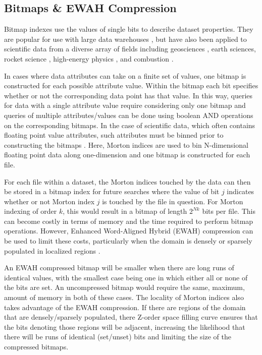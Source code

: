 \documentclass[apjl]{emulateapj}
\begin{document}
\subsection{Bitmaps \& EWAH Compression}
Bitmap indexes use the values of single bits to describe dataset properties. They are popular for use with large data warehouses \citep{Wu1998,Chan1998,Chan1999}, but have also been applied to scientific data from a diverse array of fields including geosciences \citep{Malensek2014}, earth sciences, rocket science \citep{Sinha2006,Sinha2007}, high-energy physics \citep{Stockinger2000}, and combustion \citep{Wu2003}. 

In cases where data attributes can take on a finite set of values, one bitmap is constructed for each possible attribute value. Within the bitmap each bit specifies whether or not the corresponding data point has that value. In this way, queries for data with a single attribute value require considering only one bitmap and queries of multiple attributes/values can be done using boolean AND operations on the corresponding bitmaps. In the case of scientific data, which often contains floating point value attributes, such attributes must be binned prior to constructing the bitmaps \citep{Yu1998,Shoshani1999}. Here, Morton indices are used to bin N-dimensional floating point data along one-dimension and one bitmap is constructed for each file.

For each file within a dataset, the Morton indices touched by the data can then be stored in a bitmap index for future searches where the value of bit $j$ indicates whether or not Morton index $j$ is touched by the file in question. For Morton indexing of order $k$, this would result in a bitmap of length $2^{Nk}$ bits per file. This can become costly in terms of memory and the time required to perform bitmap operations. However, Enhanced Word-Aligned Hybrid (EWAH) compression can be used to limit these costs, particularly when the domain is densely or sparsely populated in localized regions \citep{Wu2001,Lemire2010,Kaser2016}. 

An EWAH compressed bitmap will be smaller when there are long runs of identical values, with the smallest case being one in which either all or none of the bits are set. An uncompressed bitmap would require the same, maximum, amount of memory in both of these cases. The locality of Morton indices also takes advantage of the EWAH compression. If there are regions of the domain that are densely/sparsely populated, there Z-order space filling curve ensures that the bits denoting those regions will be adjacent, increasing the likelihood that there will be runs of identical (set/unset) bits and limiting the size of the compressed bitmaps.
\end{document}
